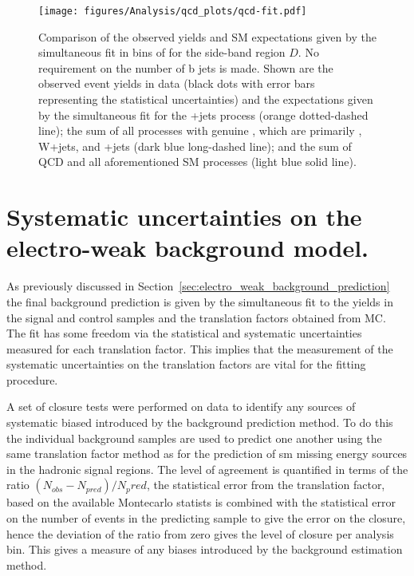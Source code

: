 \begin{figure}[!h]
  \begin{center}
    \texttt{[image: figures/Analysis/qcd\_plots/qcd-fit.pdf]}
    \caption{Comparison of the observed yields and SM expectations
      given by the simultaneous fit in bins of \HT for the
      side-band region $D$. No requirement on the number of b jets is
      made. Shown are the observed event yields in data (black dots
      with error bars representing the statistical uncertainties) and
      the expectations given by the simultaneous fit for the
      \HepProcess{\PZ\to\nu\nu}+jets process (orange dotted-dashed line); the 
      sum of all processes with genuine \MET, which are primarily 
      \HepProcess{\Ptop\APtop}, W+jets, and \HepProcess{\PZ\to\nu\nu}+jets
      (dark blue long-dashed line); and the sum of QCD and all aforementioned 
      SM processes (light blue solid line).\cite{CMS-AN-11-517}}
    \label{fig:qcd-fit}
  \end{center}
\end{figure}




\section{Systematic uncertainties on the electro-weak background model.} 
\label{sec:systematic_uncertainties_on_the_electro_weak_background_model_}
As previously discussed in Section~\ref{sec:electro_weak_background_prediction} 
the final background prediction is given by the simultaneous fit to the yields 
in the signal and control samples and the translation factors obtained from MC. 
The fit has some freedom via the statistical and systematic uncertainties 
measured for each translation factor. This implies that the measurement of the 
systematic uncertainties on the translation factors are vital for the fitting 
procedure.

A set of closure tests were performed on data to identify any sources of 
systematic biased introduced by the background prediction method.
To do this the individual background samples are used to predict one another 
using the same translation factor method as for the prediction of \ac{sm} 
missing energy sources in the hadronic signal regions. The level of agreement 
is quantified in terms of the ratio $\left(N_{obs} - N_{pred}\right)/N_pred$, 
the statistical error from the translation factor, based on the available 
Montecarlo statists is combined with the statistical error on the number of 
events in the predicting sample to give the error on the closure, hence the 
deviation of the ratio from zero gives the level of closure per analysis bin. 
This gives a measure of any biases introduced by the background estimation 
method.

